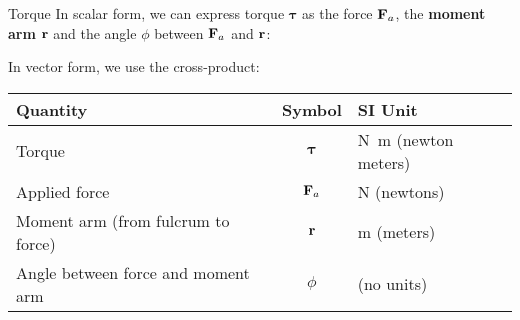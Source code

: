 \documentclass[12pt,compress,aspectratio=169]{beamer}
\newcommand{\mb}[1]{\ensuremath\mathbf{#1}}
\newcommand{\eq}[2]{\vspace{#1}{\Large\begin{displaymath}#2\end{displaymath}}}
\begin{document}
\begin{frame}{Torque}
  In scalar form, we can express torque $\bm{\tau}$ as the force $\mb{F}_a$,
  the \textbf{moment arm} $\mb{r}$ and the angle $\phi$ between $\mb{F}_a$ and
  $\mb{r}$:

  \eq{-.2in}{\boxed{\tau=rF_a\sin\phi}}
  
  \vspace{-.1in}In vector form, we use the cross-product:

  \eq{-.2in}{\boxed{\bm{\tau}=\mb{r}\times\mb{F}_a}}

  \begin{center}
    \begin{tabular}{l|c|l}
      \rowcolor{pink}
      \textbf{Quantity} & \textbf{Symbol} & \textbf{SI Unit} \\ \hline
      Torque        & $\bm{\tau}$ & \si{\newton\metre} (newton meters)\\
      Applied force & $\mb{F}_a$  & \si{\newton} (newtons)\\
      Moment arm (from fulcrum to force) & $\mb{r}$ & \si{\metre} (meters) \\
      Angle between force and moment arm & $\phi$ & (no units)
    \end{tabular}
  \end{center}
\end{frame}
\end{document}
